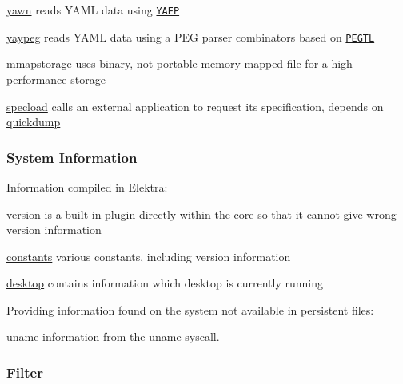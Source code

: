 \begin{DoxyItemize}
\item \hyperlink{md_src_plugins_yawn_README_src_plugins_yawn_README_md}{yawn} reads Y\+A\+ML data using \href{https://github.com/vnmakarov/yaep}{\tt Y\+A\+EP}
\item \hyperlink{md_src_plugins_yaypeg_README_src_plugins_yaypeg_README_md}{yaypeg} reads Y\+A\+ML data using a P\+EG parser combinators based on \href{https://github.com/taocpp/PEGTL}{\tt P\+E\+G\+TL}
\item \hyperlink{md_src_plugins_mmapstorage_README_src_plugins_mmapstorage_README_md}{mmapstorage} uses binary, not portable memory mapped file for a high performance storage
\item \hyperlink{md_src_plugins_specload_README_src_plugins_specload_README_md}{specload} calls an external application to request its specification, depends on \hyperlink{md_src_plugins_quickdump_README_src_plugins_quickdump_README_md}{quickdump}
\end{DoxyItemize}

\subsubsection*{System Information}

Information compiled in Elektra\+:


\begin{DoxyItemize}
\item version is a built-\/in plugin directly within the core so that it cannot give wrong version information
\item \hyperlink{md_src_plugins_constants_README_src_plugins_constants_README_md}{constants} various constants, including version information
\item \hyperlink{md_src_plugins_desktop_README_src_plugins_desktop_README_md}{desktop} contains information which desktop is currently running
\end{DoxyItemize}

Providing information found on the system not available in persistent files\+:


\begin{DoxyItemize}
\item \hyperlink{md_src_plugins_uname_README_src_plugins_uname_README_md}{uname} information from the uname syscall.
\end{DoxyItemize}

\subsubsection*{Filter}

